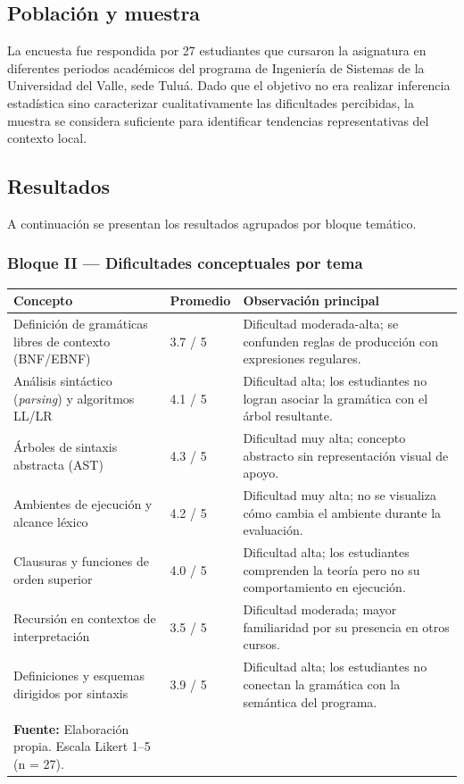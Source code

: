 \subsection{Población y muestra}

La encuesta fue respondida por 27 estudiantes que cursaron la asignatura en diferentes periodos académicos del programa de Ingeniería de Sistemas de la Universidad del Valle, sede Tuluá. Dado que el objetivo no era realizar inferencia estadística sino caracterizar cualitativamente las dificultades percibidas, la muestra se considera suficiente para identificar tendencias representativas del contexto local.

\subsection{Resultados}

A continuación se presentan los resultados agrupados por bloque temático.

\subsubsection{Bloque II — Dificultades conceptuales por tema}

\begin{longtable}{|p{7cm}|p{2cm}|p{5.5cm}|}
    \hline
    \textbf{Concepto} & \textbf{Promedio} & \textbf{Observación principal} \\
    \hline
    \endhead
    Definición de gramáticas libres de contexto (BNF/EBNF) & 3.7 / 5 & Dificultad moderada-alta; se confunden reglas de producción con expresiones regulares. \\
    \hline
    Análisis sintáctico (\textit{parsing}) y algoritmos LL/LR & 4.1 / 5 & Dificultad alta; los estudiantes no logran asociar la gramática con el árbol resultante. \\
    \hline
    Árboles de sintaxis abstracta (AST) & 4.3 / 5 & Dificultad muy alta; concepto abstracto sin representación visual de apoyo. \\
    \hline
    Ambientes de ejecución y alcance léxico & 4.2 / 5 & Dificultad muy alta; no se visualiza cómo cambia el ambiente durante la evaluación. \\
    \hline
    Clausuras y funciones de orden superior & 4.0 / 5 & Dificultad alta; los estudiantes comprenden la teoría pero no su comportamiento en ejecución. \\
    \hline
    Recursión en contextos de interpretación & 3.5 / 5 & Dificultad moderada; mayor familiaridad por su presencia en otros cursos. \\
    \hline
    Definiciones y esquemas dirigidos por sintaxis & 3.9 / 5 & Dificultad alta; los estudiantes no conectan la gramática con la semántica del programa. \\
    \hline
    \caption{Dificultad percibida por los estudiantes en los conceptos centrales de la asignatura FLP.\\
    \scriptsize \textbf{Fuente:} Elaboración propia. Escala Likert 1–5 (n = 27).}
    \label{tab:dificultad-conceptos}
\end{longtable}

